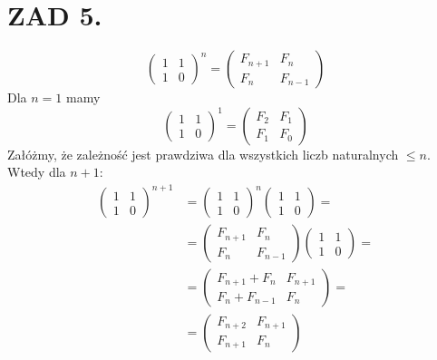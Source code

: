 \documentclass{article}[13pt]
\begin{document}
    \section*{ZAD 5.}
    $$
    \begin{pmatrix}
        1 & 1\\
        1 & 0
    \end{pmatrix}^n=
    \begin{pmatrix}
        F_{n+1} & F_n\\
        F_n & F_{n-1}
    \end{pmatrix}
    $$
    Dla $n=1$ mamy
    $$\begin{pmatrix}
        1&1\\1&0
    \end{pmatrix}^1=\begin{pmatrix}
        F_2&F_1\\F_1&F_0
    \end{pmatrix}$$
    Załóżmy, że zależność jest prawdziwa dla wszystkich liczb naturalnych $\leq n$. Wtedy dla $n+1$:
    \begin{align*}
        \begin{pmatrix}
            1 & 1\\
            1 & 0
        \end{pmatrix}^{n+1}&=
        \begin{pmatrix}
            1 & 1\\
            1 & 0
        \end{pmatrix}^n
        \begin{pmatrix}
            1 & 1\\
            1 & 0
        \end{pmatrix}=\\
        &=\begin{pmatrix}
            F_{n+1} & F_n\\
            F_n & F_{n-1}
        \end{pmatrix}
        \begin{pmatrix}
            1 & 1\\
            1 & 0
        \end{pmatrix}=\\
        &=\begin{pmatrix}
            F_{n+1}+F_n & F_{n+1}\\
            F_n+F_{n-1} & F_n
        \end{pmatrix}=\\
        &=\begin{pmatrix}
            F_{n+2} & F_{n+1}\\
            F_{n+1} & F_n
        \end{pmatrix}
    \end{align*}
\end{document}
